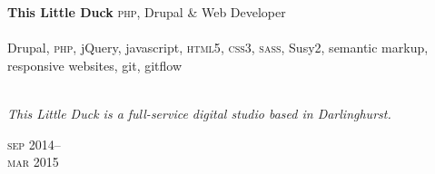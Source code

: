 \begin{minipage}[t]{0.70\textwidth}
\textbf{This Little Duck}\phantom{..} \textsc{php}, Drupal \& Web Developer \\
\\
Drupal, \textsc{php}, jQuery, javascript, \textsc{html5}, 
\textsc{css3}, \textsc{sass}, Susy2, semantic markup, responsive websites,
git, gitflow
\\
\\
{\small
\textit{This Little Duck is a full-service digital studio based in Darlinghurst.}
\par}
\end{minipage}
\begin{minipage}[t]{0.30\textwidth}
{
\hfill \textsc{sep} 2014--\\ 
\hspace*{0pt} \hfill \textsc{mar} 2015
\par
}
\end{minipage}

\vspace{0.2in}




